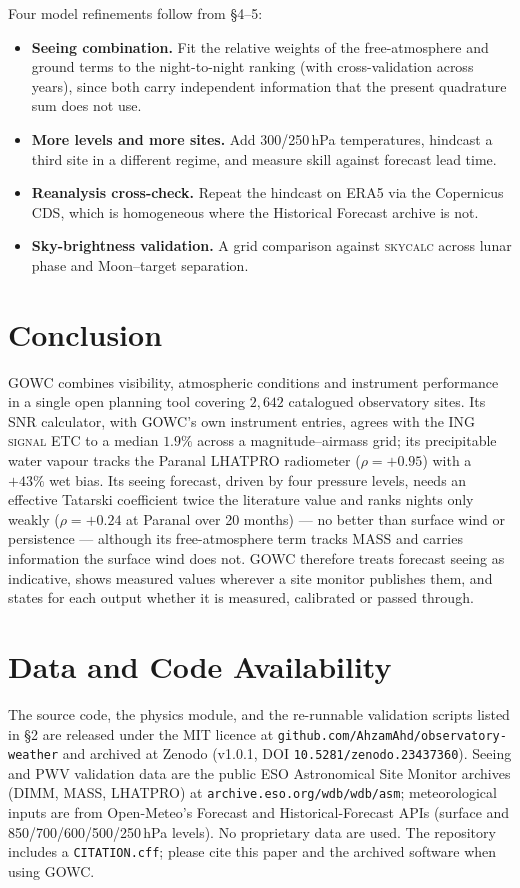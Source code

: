 \documentclass[11pt]{article}
\begin{document}
Four model refinements follow from \S4--5:
\begin{itemize}\setlength{\itemsep}{1pt}
\item \textbf{Seeing combination.} Fit the relative weights of the free-atmosphere
and ground terms to the night-to-night ranking (with cross-validation across years),
since both carry independent information that the present quadrature sum does not use.
\item \textbf{More levels and more sites.} Add 300/250\,hPa temperatures, hindcast a
third site in a different regime, and measure skill against forecast lead time.
\item \textbf{Reanalysis cross-check.} Repeat the hindcast on ERA5 via the Copernicus
CDS, which is homogeneous where the Historical Forecast archive is not.
\item \textbf{Sky-brightness validation.} A grid comparison against \textsc{skycalc}
across lunar phase and Moon--target separation.
\end{itemize}

\section{Conclusion}

GOWC combines visibility, atmospheric conditions and instrument performance in a
single open planning tool covering $2{,}642$ catalogued observatory sites. Its SNR
calculator, with GOWC's own instrument entries, agrees with the ING \textsc{signal}
ETC to a median $1.9\%$ across a magnitude--airmass grid; its precipitable water
vapour tracks the Paranal LHATPRO radiometer ($\rho=+0.95$) with a $+43\%$ wet bias.
Its seeing forecast, driven by four pressure levels, needs an effective Tatarski
coefficient twice the literature value and ranks nights only weakly ($\rho=+0.24$ at
Paranal over 20 months) --- no better than surface wind or persistence --- although
its free-atmosphere term tracks MASS and carries information the surface wind does
not. GOWC therefore treats forecast seeing as indicative, shows measured values
wherever a site monitor publishes them, and states for each output whether it is
measured, calibrated or passed through.

\section*{Data and Code Availability}
The source code, the physics module, and the re-runnable validation scripts listed
in \S2 are released under the MIT licence at
\texttt{github.com/AhzamAhd/observatory-weather} and archived at Zenodo
(v1.0.1, DOI \mbox{\texttt{10.5281/zenodo.23437360}}). Seeing and PWV validation data are the
public ESO Astronomical Site Monitor archives (DIMM, MASS, LHATPRO) at
\texttt{archive.eso.org/wdb/wdb/asm}; meteorological inputs are from Open-Meteo's
Forecast and Historical-Forecast APIs (surface and 850/700/600/500/250\,hPa levels).
No proprietary data are used. The repository includes a \texttt{CITATION.cff}; please
cite this paper and the archived software when using GOWC.
\end{document}
